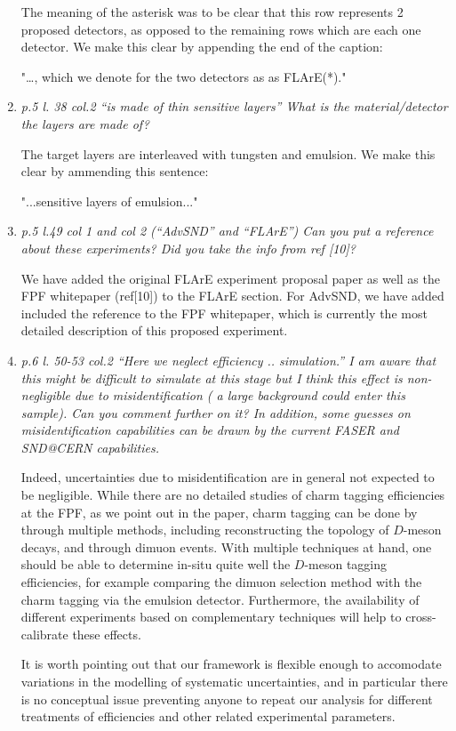 \documentclass[11pt,a4paper]{article}
\begin{document}
\begin{enumerate}
The meaning of the asterisk was to be clear that this row represents 2 proposed detectors, as opposed to the remaining rows which are each one detector. We make this clear by appending the end of the caption:

"…, which we denote for the two detectors as as FLArE(*)."

\item{\it  p.5 l. 38 col.2 “is made of thin sensitive layers” What is the material/detector the layers are made of?}

The target layers are interleaved with tungsten and emulsion. We make this clear by ammending this sentence:

"...sensitive layers of emulsion..."

\item{\it  p.5 l.49 col 1 and col 2 (“AdvSND” and “FLArE”) Can you put a reference about these experiments? Did you take the info from ref [10]?}

  We have added the original FLArE experiment proposal paper as well as the FPF whitepaper (ref[10]) to the FLArE section. For AdvSND, we have added included the reference to the FPF whitepaper, which is currently the most detailed
  description of this proposed experiment.

\item{\it p.6 l. 50-53 col.2 “Here we neglect efficiency .. simulation.” I am aware that this might be difficult to simulate at this stage but I think this effect is non-negligible due to misidentification ( a large background could enter this sample). Can you comment further on it? In addition, some guesses on misidentification capabilities can be drawn by the current FASER and SND@CERN capabilities.}

  Indeed, uncertainties due to misidentification are in general not expected to be negligible.
%
  While there are no detailed studies of charm tagging efficiencies at the FPF, as we point out in the paper, charm tagging can be done by through multiple methods, including reconstructing the topology of $D$-meson decays, and through dimuon events. With multiple techniques at hand, one should be able to determine in-situ quite well the $D$-meson tagging efficiencies, for example comparing the dimuon selection method with the charm tagging via the emulsion detector. Furthermore, the availability of different experiments based on complementary techniques will help to cross-calibrate these effects.

It is worth pointing out that our framework is flexible enough to accomodate variations in the modelling of systematic uncertainties, and in particular there is no conceptual issue preventing anyone to repeat our analysis for different treatments of efficiencies and other related experimental parameters.  



\end{enumerate}
\end{document}
